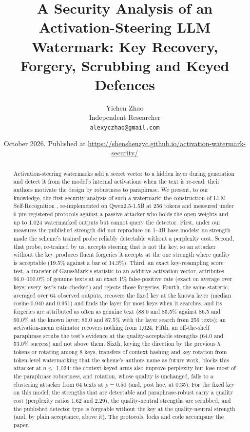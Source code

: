 \documentclass[11pt,letterpaper]{article}
\title{A Security Analysis of an Activation-Steering LLM Watermark: Key Recovery, Forgery, Scrubbing and Keyed Defences}
\author{Yichen Zhao\\ Independent Researcher\\ \texttt{alexyczhao@gmail.com}}
\date{October 2026. Published at \url{https://shenshenzyc.github.io/activation-watermark-security/}}
\begin{document}
\maketitle

\begin{abstract}
Activation-steering watermarks add a secret vector to a hidden layer during generation and detect it from the model's internal activations when the text is re-read; their authors motivate the design by robustness to paraphrase. We present, to our knowledge, the first security analysis of such a watermark: the construction of LLM Self-Recognition \citep{ardoin2026selfrecognition}, re-implemented on Qwen2.5-1.5B at 256 tokens and measured under 6 pre-registered protocols against a passive attacker who holds the open weights and up to 1,024 watermarked outputs but cannot query the detector. First, under our measures the published strength did not reproduce on 1--3B base models: no strength made the scheme's trained probe reliably detectable without a perplexity cost. Second, that probe, re-trained by us, accepts steering that is not the key, so an attacker without the key produces fluent forgeries it accepts at the one strength where quality is acceptable (19.5\% against a bar of 14.3\%). Third, an exact key-resampling score test, a transfer of GaussMark's statistic to an additive activation vector, attributes 96.0--100.0\% of genuine texts at an exact 1\% false-positive rate (exact on average over keys; every key's rate checked) and rejects those forgeries. Fourth, the same statistic, averaged over 64 observed outputs, recovers the fixed key at the known layer (median cosine 0.940 and 0.951) and finds the layer for most keys when it searches, and its forgeries are attributed as often as genuine text (88.0 and 85.5\% against 86.5 and 90.0\% at the known layer; 86.0 and 87.5\% with the layer search from 256 texts); an activation-mean estimator recovers nothing from 1,024. Fifth, an off-the-shelf paraphrase scrubs the test's evidence at the quality-acceptable strengths (64.0 and 53.0\% success) and not above them. Sixth, keying the direction by the previous \(h\) tokens or rotating among 8 keys, transfers of context hashing and key rotation from token-level watermarking that the scheme's authors name as future work, blocks this attacker at \(n \leq\) 1,024: the context-keyed arms also improve perplexity but lose most of the paraphrase robustness, and rotation, whose quality is unchanged, falls to a clustering attacker from 64 texts at \(\rho = 0.50\) (and, post hoc, at 0.35). For the fixed key on this model, the strengths that are detectable and paraphrase-robust carry a quality cost (perplexity ratios 1.62 and 2.29), the quality-neutral strengths are scrubbed, and the published detector type is forgeable without the key at the quality-neutral strength (and, by plain acceptance, above it). The protocols, locks and code accompany the paper.
\end{abstract}
\end{document}
